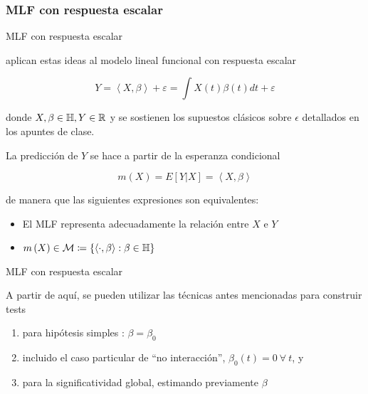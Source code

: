 \documentclass[10pt,spanish]{beamer}\usepackage[]{graphicx}\usepackage[]{color}
\begin{document}
\subsubsection{MLF con respuesta escalar}
\begin{frame}{MLF con respuesta escalar}

\cite{Garcia 2014,Cuesta 2019} aplican estas ideas al modelo lineal
funcional con respuesta escalar

\[
Y=\left\langle X,\beta\right\rangle +\varepsilon=\int X\left(t\right)\beta\left(t\right)dt+\varepsilon
\]

donde $X,\beta\in\mathbb{H},Y\in\mathbb{R}$ y se sostienen los supuestos
clásicos sobre $\epsilon$ detallados en los apuntes de clase.

\pause{}

La predicción de $Y$ se hace a partir de la esperanza condicional

\[
m\left(X\right)=E\left[Y|X\right]=\left\langle X,\beta\right\rangle 
\]


\pause{}

de manera que las siguientes expresiones son equivalentes:
\begin{itemize}
\item El MLF representa adecuadamente la relación entre $X$ e $Y$
\item $m\left(X\right)\in\mathcal{M}\coloneqq\left\{ \left\langle \cdot,\beta\right\rangle :\beta\in\mathbb{H}\right\} $
\end{itemize}
\end{frame}
%
\begin{frame}{MLF con respuesta escalar}

A partir de aquí, se pueden utilizar las técnicas antes mencionadas
para construir tests
\begin{enumerate}[<+->]
\item para hipótesis simples : $\beta=\beta_{0}$
\item incluido el caso particular de “no interacción”, $\beta_{0}\left(t\right)=0\ \forall\ t$,
y
\item para la significatividad global, estimando previamente $\beta$ 
\end{enumerate}
\end{frame}
%
\end{document}
